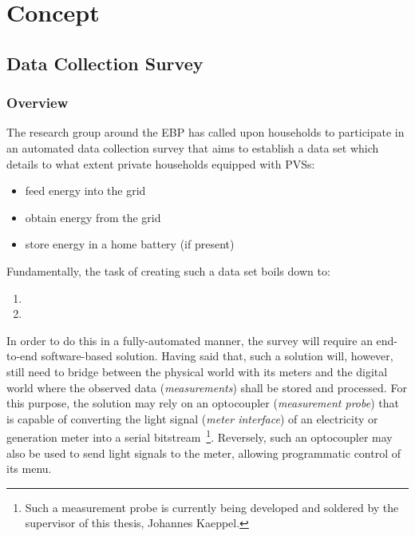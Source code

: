 
\chapter{Concept}
\label{chp:concept}

\section{Data Collection Survey}
\label{sec:data-collection-survey}

\subsection{Overview}
\label{sec:survey-overview}

The research group around the \ac{EBP} has called upon households to participate in an automated data collection survey that aims to establish a data set which details to what extent private households equipped with \acsp{PVS}:

\begin{itemize}
  \item feed energy into the grid
  \item obtain energy from the grid
  \item store energy in a home battery (if present)
\end{itemize}

Fundamentally, the task of creating such a data set boils down to:

\begin{enumerate}[label=(\Alph*)]
  \item {}
  \item {}
\end{enumerate}

In order to do this in a fully-automated manner, the survey will require an end-to-end software-based solution. Having said that, such a solution will, however, still need to bridge between the physical world with its meters and the digital world where the observed data (\textit{measurements}) shall be stored and processed. For this purpose, the solution may rely on an optocoupler (\textit{measurement probe}) that is capable of converting the light signal (\textit{meter interface}) of an electricity or generation meter into a serial bitstream~\footnote{Such a measurement probe is currently being developed and soldered by the supervisor of this thesis, Johannes Kaeppel.}. Reversely, such an optocoupler may also be used to send light signals to the meter, allowing programmatic control of its menu.

